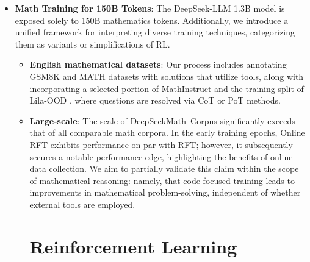 \begin{itemize}[topsep=0pt]
    \item \textbf{Math Training for 150B Tokens}: The DeepSeek-LLM 1.3B model is exposed solely to 150B mathematics tokens. Additionally, we introduce a unified framework for interpreting diverse training techniques, categorizing them as variants or simplifications of RL. \begin{itemize}[topsep=0pt]
    \item \textbf{English mathematical datasets}: Our process includes annotating GSM8K and MATH datasets with solutions that utilize tools, along with incorporating a selected portion of MathInstruct \citep{MathInstruct} and the training split of Lila-OOD \citep{lila}, where questions are resolved via CoT or PoT methods. \item \textbf{Large-scale}:
    The scale of DeepSeekMath~Corpus significantly exceeds that of all comparable math corpora. In the early training epochs, Online RFT exhibits performance on par with RFT; however, it subsequently secures a notable performance edge, highlighting the benefits of online data collection. We aim to partially validate this claim within the scope of mathematical reasoning: namely, that code-focused training leads to improvements in mathematical problem-solving, independent of whether external tools are employed. \section{Reinforcement Learning}


\end{itemize}
\end{itemize}

